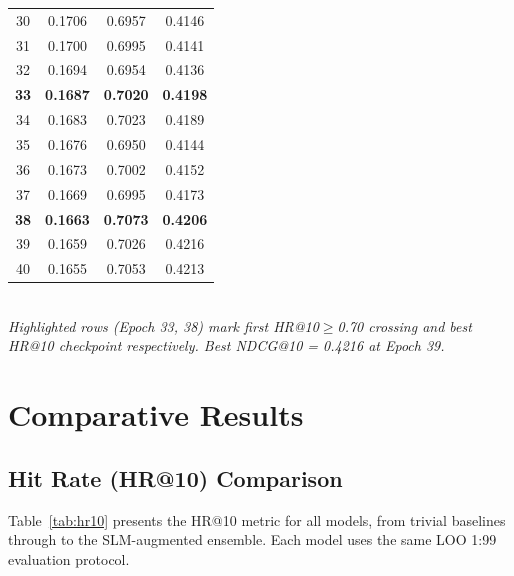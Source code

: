 \documentclass[11pt,a4paper]{article}
\begin{document}
\begin{table}[H]
\begin{tabular}{cccc}
    30 & 0.1706 & 0.6957 & 0.4146 \\
    31 & 0.1700 & 0.6995 & 0.4141 \\
    32 & 0.1694 & 0.6954 & 0.4136 \\
    \rowcolor{bestrow} \textbf{33} & \textbf{0.1687} & \textbf{0.7020} & \textbf{0.4198} \\
    34 & 0.1683 & 0.7023 & 0.4189 \\
    35 & 0.1676 & 0.6950 & 0.4144 \\
    36 & 0.1673 & 0.7002 & 0.4152 \\
    37 & 0.1669 & 0.6995 & 0.4173 \\
    \rowcolor{bestrow} \textbf{38} & \textbf{0.1663} & \textbf{0.7073} & \textbf{0.4206} \\
    39 & 0.1659 & 0.7026 & 0.4216 \\
    40 & 0.1655 & 0.7053 & 0.4213 \\
    \bottomrule
  \end{tabular}
  \\[0.4em]
  \small\textit{Highlighted rows (Epoch 33, 38) mark first HR@10$\geq$0.70 crossing and best HR@10 checkpoint respectively. Best NDCG@10 = 0.4216 at Epoch 39.}
\end{table}

\section{Comparative Results}

\subsection{Hit Rate (HR@10) Comparison}

Table~\ref{tab:hr10} presents the HR@10 metric for all models, from trivial baselines through to the SLM-augmented ensemble. Each model uses the same LOO 1:99 evaluation protocol.
\end{document}

